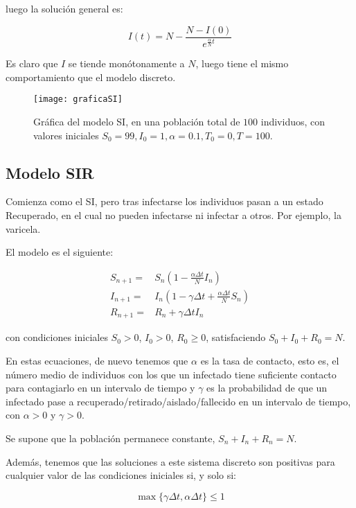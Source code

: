 luego la solución general es:

$$I(t) = N-\frac{N-I(0)}{e^{\frac{\alpha}{N}t}}$$

Es claro que $I$ se tiende monótonamente a $N$, luego tiene el mismo comportamiento que el modelo discreto.


\begin{figure}
\begin{center}
\caption{Gráfica del modelo SI, en una población total de $100$ individuos, con valores iniciales $S_0=99, I_0 = 1, \alpha = 0.1, T_0 = 0, T = 100$.}
\texttt{[image: graficaSI]}
\end{center}
\end{figure}

\subsection{Modelo SIR}
Comienza como el SI, pero tras infectarse los individuos pasan a un estado Recuperado, en el cual no pueden infectarse ni infectar a otros.
Por ejemplo, la varicela. 

El modelo es el siguiente:

\begin{equation}
\label{eqn: SIR_modelo}
\begin{aligned}
S_{n+1} = & S_n \left(1-\frac{\alpha\Delta t}{N} I_n \right) \\
I_{n+1} = & I_n \left( 1-\gamma \Delta t + \frac{\alpha\Delta t}{N} S_n \right) \\
R_{n+1} = & R_n + \gamma \Delta t I_n
\end{aligned}
\end{equation}

con condiciones iniciales $S_0>0$, $I_0>0$, $R_0\geq 0$, satisfaciendo $S_0+I_0+R_0=N$.

En estas ecuaciones, de nuevo tenemos que $\alpha$ es la tasa de contacto, esto es, el número medio de individuos con los que un infectado tiene suficiente contacto para contagiarlo en un intervalo de tiempo y $\gamma$ es la probabilidad de que un infectado pase a recuperado/retirado/aislado/fallecido en un intervalo de tiempo, con $\alpha >0$ y $\gamma >0$.

Se supone que la población permanece constante, $S_n+I_n+R_n=N$.

Además, tenemos que las soluciones a este sistema discreto son positivas para cualquier valor de las condiciones iniciales si, y solo si:

$$\max{\big\{\gamma\Delta t, \alpha\Delta t\big\} } \leq 1$$

